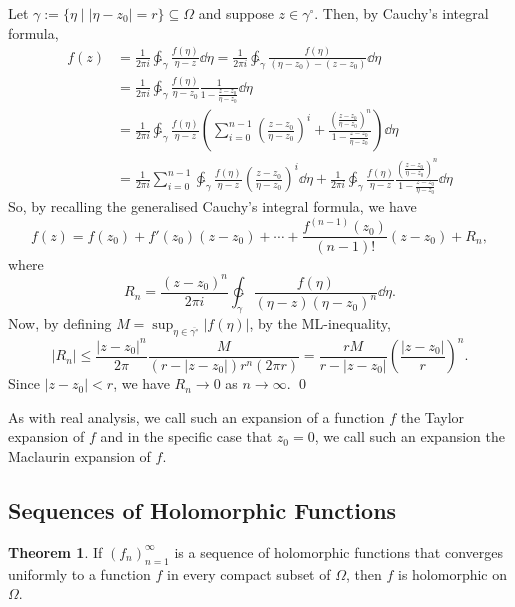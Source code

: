 \documentclass[
]{article}
\theoremstyle{definition}
\newtheorem{theorem}{Theorem}
\theoremstyle{definition}
\begin{document}
Let \(\gamma := \{\eta \mid |\eta - z_0| = r\} \subseteq \Omega\) and
suppose \(z \in \gamma^\circ\). Then, by Cauchy's integral formula,
\[\begin{split}
    f(z) & = \frac{1}{2\pi i} \ointctrclockwise_\gamma \frac{f(\eta)}{\eta - z} \dd \eta
        = \frac{1}{2\pi i} \ointctrclockwise_\gamma \frac{f(\eta)}{(\eta - z_0) - (z - z_0)} \dd \eta\\
      & = \frac{1}{2\pi i} \ointctrclockwise_\gamma \frac{f(\eta)}{\eta - z_0} 
        \frac{1}{1 - \frac{z - z_0}{\eta - z_0}} \dd \eta\\
      & = \frac{1}{2\pi i} \ointctrclockwise_\gamma \frac{f(\eta)}{\eta - z} 
        \left(\sum_{i = 0}^{n - 1} \left(\frac{z - z_0}{\eta - z_0}\right)^i + 
        \frac{\left(\frac{z - z_0}{\eta - z_0}\right)^n}{1 - \frac{z - z_0}{\eta - z_0}} \right) \dd \eta\\
      & = \frac{1}{2\pi i} \sum_{i = 0}^{n - 1} \ointctrclockwise_\gamma \frac{f(\eta)}{\eta - z} 
        \left(\frac{z - z_0}{\eta - z_0}\right)^i \dd \eta + 
        \frac{1}{2\pi i} \ointctrclockwise_\gamma \frac{f(\eta)}{\eta - z} 
        \frac{\left(\frac{z - z_0}{\eta - z_0}\right)^n}{1 - \frac{z - z_0}{\eta - z_0}} \dd \eta
  \end{split}\] So, by recalling the generalised Cauchy's integral
formula, we have
\[f(z) = f(z_0) + f'(z_0)(z - z_0) + \cdots + \frac{f^{(n - 1)}(z_0)}{(n - 1)!}(z - z_0) 
    + R_n,\] where
\[R_n = \frac{(z - z_0)^n}{2\pi i} \ointctrclockwise_\gamma 
      \frac{f(\eta)}{(\eta - z)(\eta - z_0)^n} \dd \eta.\] Now, by
defining \(M = \sup_{\eta \in \overline{\gamma^\circ}} |f(\eta)|\), by
the ML-inequality,
\[|R_n| \le \frac{|z - z_0|^n}{2\pi}\frac{M}{(r - |z - z_0|)r^n(2\pi r)} 
    = \frac{rM}{r - |z - z_0|}\left(\frac{|z - z_0|}{r}\right)^n.\]
Since \(|z - z_0| < r\), we have \(R_n \to 0\) as \(n \to \infty\). \qed

As with real analysis, we call such an expansion of a function \(f\) the
Taylor expansion of \(f\) and in the specific case that \(z_0 = 0\), we
call such an expansion the Maclaurin expansion of \(f\).

\hypertarget{sequences-of-holomorphic-functions}{%
\subsection{Sequences of Holomorphic
Functions}\label{sequences-of-holomorphic-functions}}

\begin{theorem}
  If \((f_n)_{n = 1}^\infty\) is a sequence of holomorphic functions that converges 
  uniformly to a function \(f\) in every compact subset of \(\Omega\), then 
  \(f\) is holomorphic on \(\Omega\).
\end{theorem}
\end{document}
